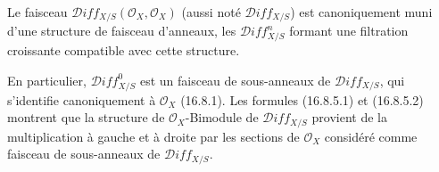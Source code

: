 \begin{corollary}[16.8.10]
\label{IV.16.8.10}
Le faisceau $\mathscr{D}\!iff_{X/S}(\mathcal{O}_X,\mathcal{O}_X)$ (aussi noté
$\mathscr{D}\!iff_{X/S}$) est canoniquement muni d'une structure de faisceau
d'anneaux, les $\mathscr{D}\!iff_{X/S}^n$ formant une filtration croissante
compatible avec cette structure.
\end{corollary}

En particulier, $\mathscr{D}\!iff_{X/S}^0$ est un faisceau de sous-anneaux de
$\mathscr{D}\!iff_{X/S}$, qui s'identifie canoniquement à $\mathcal{O}_X$
(16.8.1). Les formules (16.8.5.1) et (16.8.5.2) montrent que la structure de
$\mathcal{O}_X$-Bimodule de $\mathscr{D}\!iff_{X/S}$ provient de la
multiplication à gauche et à droite par les sections de $\mathcal{O}_X$
considéré comme faisceau de sous-anneaux de $\mathscr{D}\!iff_{X/S}$.

